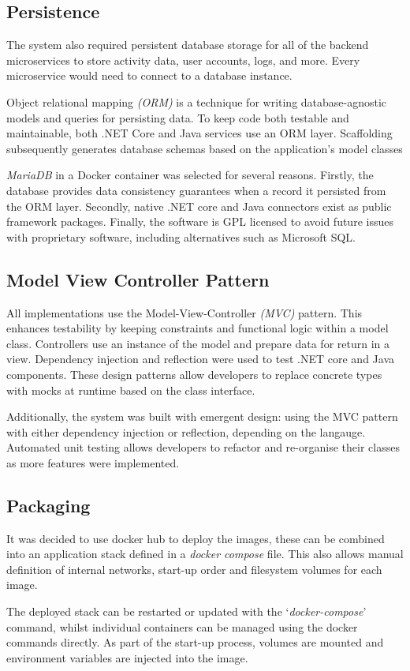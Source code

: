 \subsection{Persistence}
    \par
    The system also required persistent database storage for all of the backend microservices to store activity data, user accounts, logs, and more. Every microservice would need to connect to a database instance.

    \par
    Object relational mapping \textit{(ORM)} is a technique for writing database-agnostic models and queries for persisting data. To keep code both testable and maintainable, both .NET Core and Java services use an ORM layer. Scaffolding subsequently generates database schemas based on the application's model classes

    \par
    \textit{MariaDB}\cite{MariaDB} in a Docker container was selected for several reasons. Firstly, the database provides data consistency guarantees when a record it persisted from the ORM layer. Secondly, native .NET core and Java connectors exist as public framework packages. Finally, the software is GPL licensed to avoid future issues with proprietary software, including alternatives such as Microsoft SQL.

\subsection{Model View Controller Pattern}
    \par
    All implementations use the Model-View-Controller \textit{(MVC)}
    pattern. This enhances testability by keeping constraints and functional logic within a model class. Controllers use an instance of the model and prepare data for return in a view. Dependency injection and reflection were used to test .NET core and Java components. These design patterns allow developers to replace concrete types with mocks at runtime based on the class interface.

    \par
    Additionally, the system was built with emergent design: using the MVC pattern with either dependency injection or reflection, depending on the langauge. Automated unit testing allows developers to refactor and re-organise their classes as more features were implemented.	

\subsection{Packaging}
    \par
    It was decided to use docker hub to deploy the images, these can be combined into an application stack defined in a \textit{docker compose} file. This also allows manual definition of internal networks, start-up order and filesystem volumes for each image.

    \par
    The deployed stack can be restarted or updated with the `\textit{docker-compose}' command, whilst individual containers can be managed using the docker commands directly. As part of the start-up process, volumes are mounted and environment variables are injected into the image.